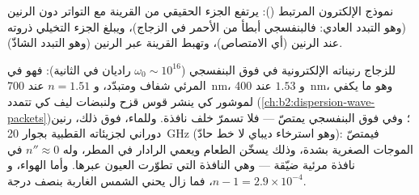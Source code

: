 \begin{omfigure}

{\small نموذج الإلكترون المرتبط (): يرتفع الجزء الحقيقي من القرينة
مع التواتر دون الرنين (وهو التبدد العادي: فالبنفسجي
أبطأ من الأحمر في الزجاج)، ويبلغ الجزء التخيلي ذروته عند
الرنين (أي الامتصاص)، وتهبط القرينة عبر الرنين
(وهو التبدد الشاذّ).}
\end{omfigure}

\begin{example}\label{ex:b2:waves-in-media:dielectrics}
للزجاج رنيناته الإلكترونية في فوق البنفسجي ($\omega_0 \sim 10^{16}$
راديان في الثانية): فهو في المرئي شفاف ومتبدّد، و $n = 1.51$ عند
\qty{700}{nm}، و $1.53$ عند \qty{400}{nm}، وهو ما يكفي لموشور كي ينشر
قوس قزح ولنبضات ليف كي تتمدد (\cref{ch:b2:dispersion-wave-packets})؛
وفي فوق البنفسجي يمتصّ --- فلا تسمرّ خلف نافذة.
وللماء، فوق ذلك، رنين دوراني لجزيئاته القطبية بجوار
\qty{20}{GHz} (وهو استرخاء ديباي لا خط حادّ): فيمتصّ
الموجات الصغرية بشدة، وذلك يسخّن الطعام ويعمي الرادار في المطر،
وله $n'' \approx 0$ في نافذة مرئية ضيّقة --- وهي النافذة التي
تطوّرت العيون عبرها. وأما الهواء، و $n - 1 = 2.9 \times 10^{-4}$، فما زال يحني
الشمس الغاربة بنصف درجة.
\end{example}

